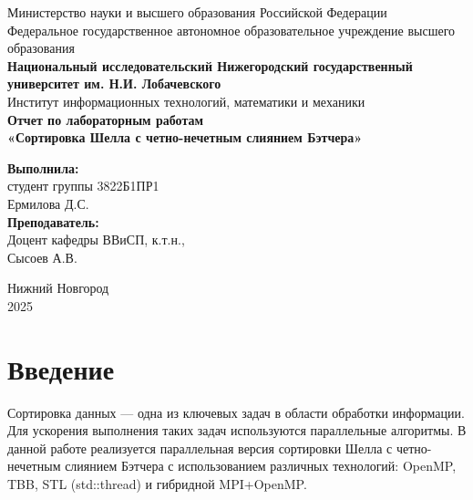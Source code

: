 \documentclass[a4paper,12pt]{article}
\renewcommand{\normalsize}{\fontsize{14}{16.8}\selectfont}
\begin{document}
\thispagestyle{empty}
\begin{center}
    Министерство науки и высшего образования Российской Федерации\\[0.5cm]
    Федеральное государственное автономное образовательное учреждение высшего образования\\[0.1cm]
    \textbf{Национальный исследовательский Нижегородский государственный университет им. Н.И. Лобачевского}\\[0.1cm]
    Институт информационных технологий, математики и механики\\[2.5cm]

    \Huge
    \textbf{Отчет по лабораторным работам}\\[0.5cm]
    \LARGE
    \textbf{«Сортировка Шелла с четно-нечетным слиянием Бэтчера»}\\[2cm]

    \normalsize
    \begin{flushright}
        \textbf{Выполнила:}\\
        студент группы 3822Б1ПР1\\
        Ермилова Д.С.\\[1cm]

        \textbf{Преподаватель:}\\
        Доцент кафедры ВВиСП, к.т.н.,\\
        Сысоев А.В.\\
    \end{flushright}
    \vfill
    Нижний Новгород\\
    2025
\end{center}
\newpage 

\tableofcontents
\newpage

\section{Введение}
Сортировка данных — одна из ключевых задач в области обработки информации. Для ускорения выполнения таких задач используются параллельные алгоритмы. В данной работе реализуется параллельная версия сортировки Шелла с четно-нечетным слиянием Бэтчера с использованием различных технологий: OpenMP, TBB, STL (std::thread) и гибридной MPI+OpenMP.
\end{document}
